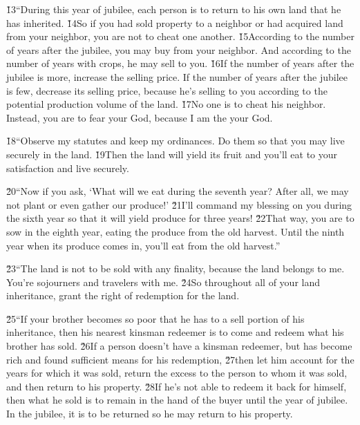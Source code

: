 \v{13}``During this year of jubilee, each person is to return to his own land that he has inherited. \v{14}So if you had sold property to a neighbor or had acquired land from your neighbor, you are not to cheat one another. \v{15}According to the number of years after the jubilee, you may buy from your neighbor. And according to the number of years with crops, he may sell to you. \v{16}If the number of years after the jubilee is more, increase the selling price. If the number of years after the jubilee is few, decrease its selling price, because he's selling to you according to the potential production volume of the land. \v{17}No one is to cheat his neighbor. Instead, you are to fear your God, because I am the  your God.

\v{18}``Observe my statutes and keep my ordinances. Do them so that you may live securely in the land. \v{19}Then the land will yield its fruit and you'll eat to your satisfaction and live securely.

\v{20}``Now if you ask, `What will we eat during the seventh year? After all, we may not plant or even gather our produce!' \v{21}I'll command my blessing on you during the sixth year so that it will yield produce for three years! \v{22}That way, you are to sow in the eighth year, eating the produce from the old harvest. Until the ninth year when its produce comes in, you'll eat from the old harvest.''

\v{23}``The land is not to be sold with any finality, because the land belongs to me. You're sojourners and travelers with me. \v{24}So throughout all of your land inheritance, grant the right of redemption for the land.

\v{25}``If your brother becomes so poor that he has to a sell portion of his inheritance, then his nearest kinsman redeemer is to come and redeem what his brother has sold. \v{26}If a person doesn't have a kinsman redeemer, but has become rich and found sufficient means for his redemption, \v{27}then let him account for the years for which it was sold, return the excess to the person to whom it was sold, and then return to his property. \v{28}If he's not able to redeem it back for himself, then what he sold is to remain in the hand of the buyer until the year of jubilee. In the jubilee, it is to be returned so he may return to his property.

